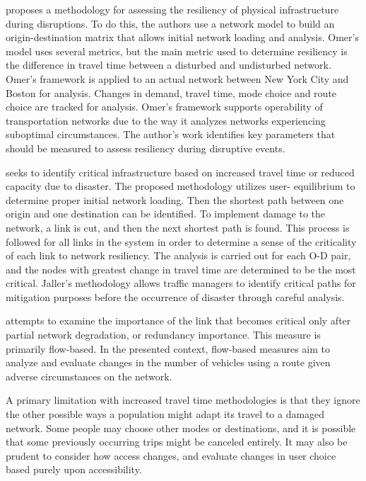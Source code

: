 \citet{omer2013} proposes a methodology for assessing the resiliency of
physical infrastructure
during disruptions. To do this, the authors use a network model to build
an origin-destination
matrix that allows initial network loading and analysis. Omer’s model uses
several metrics, but
the main metric used to determine resiliency is the difference in travel
time between a disturbed
and undisturbed network. Omer’s framework is applied to an actual network
between New York City
and Boston for analysis. Changes in demand, travel time, mode choice and
route choice are tracked
for analysis. Omer’s framework supports operability of transportation
networks due to the way it
analyzes networks experiencing suboptimal circumstances. The author's work
identifies key
parameters that should be measured to assess resiliency during disruptive
events.

\citet{jaller2015} seeks to identify critical infrastructure based on
increased travel time or
reduced capacity due to disaster. The proposed methodology utilizes user-
equilibrium to determine
proper initial network loading. Then the shortest path between one origin
and one destination
can be identified. To implement damage to the network, a link is cut, and
then the next shortest
path is found. This process is followed for all links in the system in
order to determine a sense
of the criticality of each link to network resiliency. The analysis is
carried out for each O-D
pair, and the nodes with greatest change in travel time are determined to
be the most critical.
Jaller’s methodology allows traffic managers to identify critical paths
for mitigation purposes
before the occurrence of disaster through careful analysis.

\citet{Jenelius2010} attempts to examine the importance of the link that
becomes critical only after partial network degradation, or redundancy
importance. This measure is primarily flow-based. In the presented context,
flow-based measures aim to analyze and evaluate changes in the number of
vehicles using a route given adverse circumstances on the network.

A primary limitation with increased travel time methodologies is that they
ignore the other possible ways a population might adapt its travel to a
damaged
network. Some people may choose other modes or destinations, and it is
possible
that some previously occurring trips might be canceled entirely. It may also be
prudent to consider how access changes, and evaluate changes in user choice
based purely upon accessibility.

